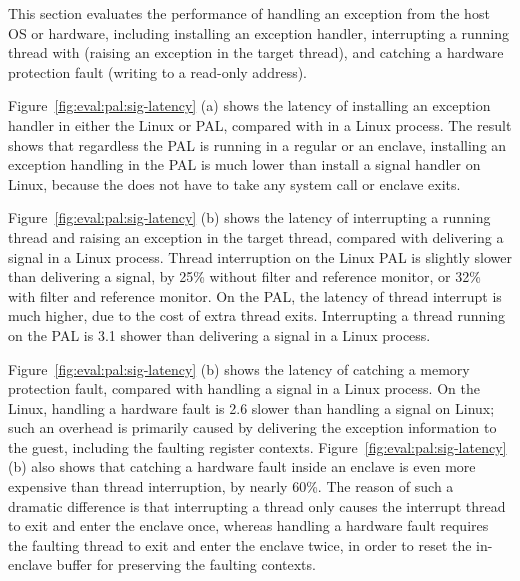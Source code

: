 

This section evaluates the performance of handling an exception from the host OS or hardware,
including installing an exception handler,
interrupting a running thread
with  (raising an  exception in the target thread),
and catching a hardware protection fault
(writing to a read-only address).






Figure~\ref{fig:eval:pal:sig-latency} (a)
shows the latency of installing an exception handler in either the Linux or \sgx{} PAL, compared with
 in a Linux process.
The result
shows that regardless the PAL is running in a regular \picoproc{} or an enclave,
installing an exception handling
in the PAL
is much lower than install a signal handler
on Linux,
because the \hostapi{} does not have to take any system call or enclave exits.


Figure~\ref{fig:eval:pal:sig-latency} (b)
shows the latency of interrupting a running thread
and raising an exception
in the target thread, compared with delivering a  signal in a Linux process.
Thread interruption on the Linux PAL
is slightly slower than
delivering a  signal,
by \roughly{}25\% without \seccomp{} filter and reference monitor, or \roughly{}32\% with \seccomp{} filter and reference monitor.
On the \sgx{} PAL,
the latency of thread interrupt
is much higher, due to the cost of extra thread exits.
Interrupting a thread running on the \sgx{} PAL
is \roughly{}3.1\x{} shower than delivering a  signal in a Linux process.



Figure~\ref{fig:eval:pal:sig-latency} (b)
shows the latency of catching a memory protection fault,
compared with handling
a  signal in a Linux process.
On the Linux, handling a hardware fault is \roughly{}2.6\x{} slower than handling a  signal on Linux;
such an overhead
is primarily caused by delivering
the exception information to the guest, including the faulting register contexts.
Figure~\ref{fig:eval:pal:sig-latency} (b)
also shows that catching a hardware fault inside an enclave
is even more expensive
than thread interruption, by nearly 60\%.
The reason of such a dramatic difference is that
interrupting a thread only causes the interrupt thread to exit and enter the enclave once,
whereas handling a hardware fault
requires the faulting thread to exit and enter the enclave twice,
in order to reset the in-enclave buffer
for preserving the faulting contexts.


